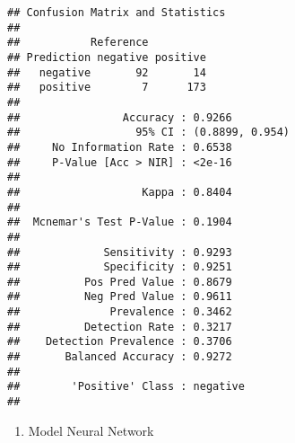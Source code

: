 \documentclass[]{article}
\newenvironment{Shaded}{\begin{snugshade}}{\end{snugshade}}
\newcommand{\DataTypeTok}[1]{\textcolor[rgb]{0.13,0.29,0.53}{#1}}
\newcommand{\KeywordTok}[1]{\textcolor[rgb]{0.13,0.29,0.53}{\textbf{#1}}}
\newcommand{\NormalTok}[1]{#1}
\newcommand{\OperatorTok}[1]{\textcolor[rgb]{0.81,0.36,0.00}{\textbf{#1}}}
\newcommand{\StringTok}[1]{\textcolor[rgb]{0.31,0.60,0.02}{#1}}
\providecommand{\tightlist}{%
  \setlength{\itemsep}{0pt}\setlength{\parskip}{0pt}}
\begin{document}
\begin{Shaded}
\end{Shaded}

\begin{verbatim}
## Confusion Matrix and Statistics
## 
##           Reference
## Prediction negative positive
##   negative       92       14
##   positive        7      173
##                                          
##                Accuracy : 0.9266         
##                  95% CI : (0.8899, 0.954)
##     No Information Rate : 0.6538         
##     P-Value [Acc > NIR] : <2e-16         
##                                          
##                   Kappa : 0.8404         
##                                          
##  Mcnemar's Test P-Value : 0.1904         
##                                          
##             Sensitivity : 0.9293         
##             Specificity : 0.9251         
##          Pos Pred Value : 0.8679         
##          Neg Pred Value : 0.9611         
##              Prevalence : 0.3462         
##          Detection Rate : 0.3217         
##    Detection Prevalence : 0.3706         
##       Balanced Accuracy : 0.9272         
##                                          
##        'Positive' Class : negative       
## 
\end{verbatim}

\begin{enumerate}
\def\labelenumi{\arabic{enumi}.}
\setcounter{enumi}{2}
\tightlist
\item
  Model Neural Network
\end{enumerate}

\begin{Shaded}
\end{Shaded}
\end{document}
